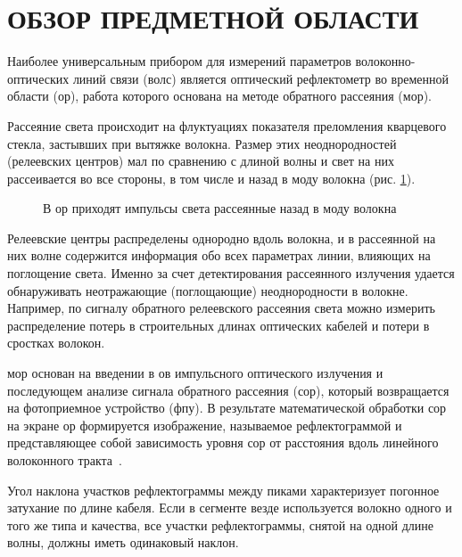 \section{ОБЗОР ПРЕДМЕТНОЙ ОБЛАСТИ}


Наиболее универсальным прибором для измерений параметров волоконно-оптических линий связи (\acrshort{волс}) является оптический рефлектометр во временной области (\acrshort{ор}), работа которого основана на методе обратного рассеяния (\acrshort{мор}).

Рассеяние света происходит на флуктуациях показателя преломления кварцевого стекла, застывших при вытяжке волокна. Размер этих неоднородностей (релеевских центров) мал по сравнению с длиной волны и свет на них рассеивается во все стороны, в том числе и назад в моду волокна (рис. \ref{ris:obr_rass}).

\begin{figure}[h]
  \caption{В \acrshort{ор} приходят импульсы света рассеянные назад в моду волокна}
  \label{ris:obr_rass}
\end{figure}

Релеевские центры распределены однородно вдоль волокна, и в рассеянной на них волне содержится информация обо всех параметрах линии, влияющих на поглощение света. Именно за счет детектирования рассеянного излучения удается обнаруживать неотражающие (поглощающие) неоднородности в волокне. Например, по сигналу обратного релеевского рассеяния света можно измерить распределение потерь в строительных длинах оптических кабелей и потери в сростках волокон.

\acrshort{мор} основан на введении в \acrshort{ов} импульсного оптического излучения и последующем анализе сигнала обратного рассеяния (\acrshort{сор}), который возвращается на фотоприемное устройство (\acrshort{фпу}). В результате математической обработки \acrshort{сор} на экране \acrshort{ор} формируется изображение, называемое рефлектограммой и представляющее собой зависимость уровня \acrshort{сор} от расстояния вдоль линейного волоконного тракта~\cite{bogdanova:reflectometria}.

Угол наклона участков рефлектограммы между пиками характеризует погонное затухание по длине кабеля. Если в сегменте везде используется волокно одного и того же типа и качества, все участки рефлектограммы, снятой на одной длине волны, должны иметь одинаковый наклон.

